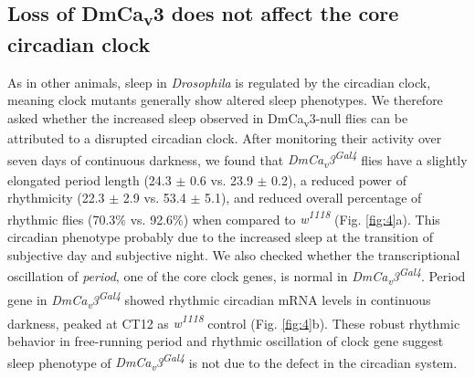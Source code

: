 \subsection*{Loss of DmCa\textsubscript{v}3 does not affect the core circadian clock}

As in other animals, sleep in \emph{Drosophila} is regulated by the circadian clock, meaning clock mutants generally show altered sleep phenotypes\cite{hendricks:2003aa, parisky:2008aa}.
We therefore asked whether the increased sleep observed in DmCa\textsubscript{v}3-null flies can be attributed to a disrupted circadian clock.
After monitoring their activity over seven days of continuous darkness, we found that \emph{DmCa\textsubscript{v}3\textsuperscript{Gal4}} flies have a slightly elongated period length (24.3 $\pm$ 0.6 vs. 23.9 $\pm$ 0.2), a reduced power of rhythmicity (22.3 $\pm$ 2.9 vs. 53.4 $\pm$ 5.1), and reduced overall percentage of rhythmic flies (70.3\% vs. 92.6\%) when compared to \emph{w\textsuperscript{1118}} (Fig. \ref{fig:4}a).
This circadian phenotype probably due to the increased sleep at the transition of subjective day and subjective night.
We also checked whether the transcriptional oscillation of \emph{period}, one of the core clock genes, is normal in \emph{DmCa\textsubscript{v}3\textsuperscript{Gal4}}. 
Period gene in \emph{DmCa\textsubscript{v}3\textsuperscript{Gal4}} showed rhythmic circadian mRNA levels in continuous darkness, peaked at CT12 as \emph{w\textsuperscript{1118}} control (Fig. \ref{fig:4}b).
These robust rhythmic behavior in free-running period and rhythmic oscillation of clock gene suggest sleep phenotype of \emph{DmCa\textsubscript{v}3\textsuperscript{Gal4}} is not due to the defect in the circadian system. 
